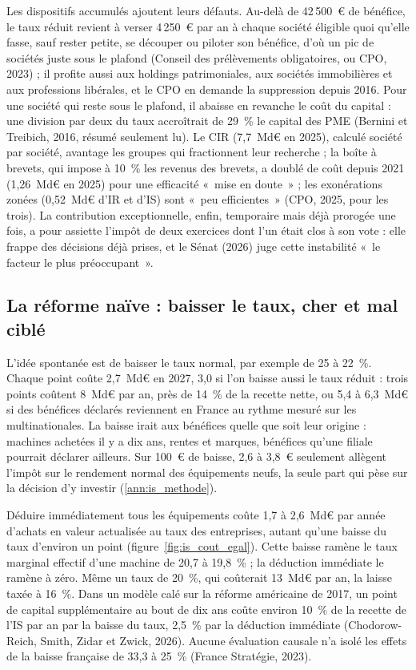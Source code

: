 \documentclass[11pt,a4paper]{article}
\begin{document}
Les dispositifs accumulés ajoutent leurs défauts. Au-delà de 42\,500~€ de bénéfice, le taux réduit revient à verser
4\,250~€ par an à chaque société éligible quoi qu'elle fasse, sauf rester petite, se découper ou piloter son bénéfice,
d'où un pic de sociétés juste sous le plafond (Conseil des prélèvements obligatoires, ou CPO, 2023) ; il profite aussi
aux holdings patrimoniales, aux sociétés immobilières et aux professions libérales, et le CPO en demande la suppression
depuis 2016. Pour une société qui reste sous le plafond, il abaisse en revanche le coût du capital : une division par
deux du taux accroîtrait de 29~\% le capital des PME (Bernini et Treibich, 2016, résumé seulement lu). Le CIR (7,7~Md€
en 2025), calculé société par société, avantage les groupes qui fractionnent leur recherche ; la boîte à brevets, qui
impose à 10~\% les revenus des brevets, a doublé de coût depuis 2021 (1,26~Md€ en 2025) pour une efficacité «~mise en
doute~» ; les exonérations zonées (0,52~Md€ d'IR et d'IS) sont «~peu efficientes~» (CPO, 2025, pour les trois). La
contribution exceptionnelle, enfin, temporaire mais déjà prorogée une fois, a pour assiette l'impôt de deux exercices
dont l'un était clos à son vote : elle frappe des décisions déjà prises, et le Sénat (2026) juge cette instabilité
«~le facteur le plus préoccupant~».

\subsection{La réforme naïve : baisser le taux, cher et mal ciblé}\label{sec:is_naif}

L'idée spontanée est de baisser le taux normal, par exemple de 25 à 22~\%. Chaque point coûte 2,7~Md€ en 2027, 3,0 si
l'on baisse aussi le taux réduit : trois points coûtent 8~Md€ par an, près de 14~\% de la recette nette, ou 5,4 à
6,3~Md€ si des bénéfices déclarés reviennent en France au rythme mesuré sur les multinationales. La baisse irait aux
bénéfices quelle que soit leur origine : machines achetées il y a dix ans, rentes et marques, bénéfices qu'une filiale
pourrait déclarer ailleurs. Sur 100~€ de baisse, 2,6 à 3,8~€ seulement allègent l'impôt sur le rendement normal des
équipements neufs, la seule part qui pèse sur la décision d'y investir (\ref{ann:is_methode}).

Déduire immédiatement tous les équipements coûte 1,7 à 2,6~Md€ par année d'achats en valeur actualisée au taux des entreprises, autant
qu'une baisse du taux d'environ un point (figure~\ref{fig:is_cout_egal}). Cette baisse ramène le taux marginal effectif d'une machine de 20,7 à 19,8~\% ; la déduction immédiate le ramène
à zéro. Même un taux de 20~\%, qui coûterait 13~Md€ par an, la laisse taxée à 16~\%. Dans un modèle calé sur la
réforme américaine de 2017, un point de capital supplémentaire au bout de dix ans coûte environ 10~\% de la recette de
l'IS par an par la baisse du taux, 2,5~\% par la déduction immédiate (Chodorow-Reich, Smith, Zidar et Zwick, 2026).
Aucune évaluation causale n'a isolé les effets de la baisse française de 33,3 à 25~\% (France Stratégie, 2023).
\end{document}

